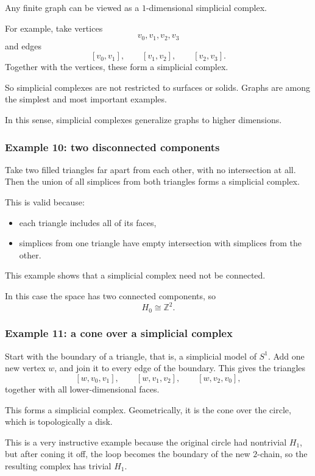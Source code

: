 \documentclass[12pt,a4paper]{article}
\theoremstyle{notespace}
\begin{document}
Any finite graph can be viewed as a \(1\)-dimensional simplicial complex.

For example, take vertices
\[
v_0,v_1,v_2,v_3
\]
and edges
\[
[v_0,v_1],\qquad [v_1,v_2],\qquad [v_2,v_3].
\]
Together with the vertices, these form a simplicial complex.

So simplicial complexes are not restricted to surfaces or solids. Graphs are among the simplest and most important examples.

In this sense, simplicial complexes generalize graphs to higher dimensions.

\subsubsection{Example 10: two disconnected components}

Take two filled triangles far apart from each other, with no intersection at all. Then the union of all simplices from both triangles forms a simplicial complex.

This is valid because:
\begin{itemize}
	\item each triangle includes all of its faces,
	\item simplices from one triangle have empty intersection with simplices from the other.
\end{itemize}

This example shows that a simplicial complex need not be connected.

In this case the space has two connected components, so
\[
H_0\cong \mathbb{Z}^2.
\]

\subsubsection{Example 11: a cone over a simplicial complex}

Start with the boundary of a triangle, that is, a simplicial model of \(S^1\). Add one new vertex \(w\), and join it to every edge of the boundary. This gives the triangles
\[
[w,v_0,v_1],\qquad
[w,v_1,v_2],\qquad
[w,v_2,v_0],
\]
together with all lower-dimensional faces.

This forms a simplicial complex. Geometrically, it is the cone over the circle, which is topologically a disk.

This is a very instructive example because the original circle had nontrivial \(H_1\), but after coning it off, the loop becomes the boundary of the new \(2\)-chain, so the resulting complex has trivial \(H_1\).
\end{document}
